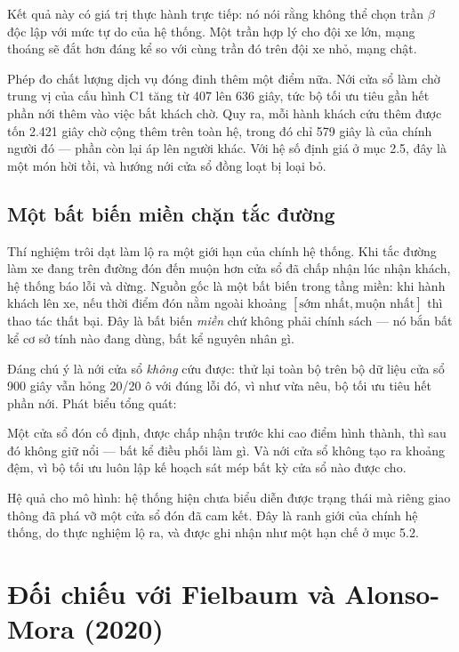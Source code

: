 Kết quả này có giá trị thực hành trực tiếp: nó nói rằng không thể chọn trần $\beta$ độc lập với
mức tự do của hệ thống. Một trần hợp lý cho đội xe lớn, mạng thoáng sẽ đắt hơn đáng kể so với
cùng trần đó trên đội xe nhỏ, mạng chật.

Phép đo chất lượng dịch vụ đóng đinh thêm một điểm nữa. Nới cửa sổ làm chờ trung vị của cấu
hình C1 tăng từ 407 lên 636 giây, tức bộ tối ưu tiêu gần hết phần nới thêm vào việc bắt khách
chờ. Quy ra, mỗi hành khách cứu thêm được tốn 2.421 giây chờ cộng thêm trên toàn hệ, trong đó
chỉ 579 giây là của chính người đó --- phần còn lại áp lên người khác. Với hệ số định giá ở mục
2.5, đây là một món hời tồi, và hướng nới cửa sổ đồng loạt bị loại bỏ.

\subsection{Một bất biến miền chặn tắc đường}
\label{muc:batbien}

Thí nghiệm trôi dạt làm lộ ra một giới hạn của chính hệ thống. Khi tắc đường làm xe đang trên
đường đón đến muộn hơn cửa sổ đã chấp nhận lúc nhận khách, hệ thống báo lỗi và dừng. Nguồn gốc
là một bất biến trong tầng miền: khi hành khách lên xe, nếu thời điểm đón nằm ngoài khoảng
$[\text{sớm nhất}, \text{muộn nhất}]$ thì thao tác thất bại. Đây là bất biến \emph{miền} chứ
không phải chính sách --- nó bắn bất kể cơ sở tính nào đang dùng, bất kể nguyên nhân gì.

Đáng chú ý là nới cửa sổ \emph{không} cứu được: thử lại toàn bộ trên bộ dữ liệu cửa sổ 900 giây
vẫn hỏng 20/20 ô với đúng lỗi đó, vì như vừa nêu, bộ tối ưu tiêu hết phần nới. Phát biểu tổng
quát:

\begin{khungy}
Một cửa sổ đón cố định, được chấp nhận trước khi cao điểm hình thành, thì sau đó không giữ nổi
--- bất kể điều phối làm gì. Và nới cửa sổ không tạo ra khoảng đệm, vì bộ tối ưu luôn lập kế
hoạch sát mép bất kỳ cửa sổ nào được cho.
\end{khungy}

Hệ quả cho mô hình: hệ thống hiện chưa biểu diễn được trạng thái mà riêng giao thông đã phá vỡ
một cửa sổ đón đã cam kết. Đây là ranh giới của chính hệ thống, do thực nghiệm lộ ra, và được
ghi nhận như một hạn chế ở mục 5.2.

\section{Đối chiếu với Fielbaum và Alonso-Mora (2020)}
\label{muc:doichieu}


